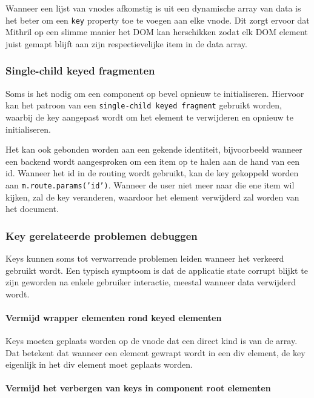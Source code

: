 Wanneer een lijst van vnodes afkomstig is uit een dynamische array van data is het beter om een \texttt{key} property toe te voegen aan elke vnode. Dit zorgt ervoor dat Mithril op een slimme manier het DOM kan herschikken zodat elk DOM element juist gemapt blijft aan zijn respectievelijke item in de data array. \autocite{Mithril2019d}

\subsubsection{Single-child keyed fragmenten}

Soms is het nodig om een component op bevel opnieuw te initialiseren. Hiervoor kan het patroon van een \texttt{single-child keyed fragment} gebruikt worden, waarbij de key aangepast wordt om het element te verwijderen en opnieuw te initialiseren. \autocite{Mithril2019d}

Het kan ook gebonden worden aan een gekende identiteit, bijvoorbeeld wanneer een backend wordt aangesproken om een item op te halen aan de hand van een id. Wanneer het id in de routing wordt gebruikt, kan de key gekoppeld worden aan \texttt{m.route.params('id')}. Wanneer de user niet meer naar die ene item wil kijken, zal de key veranderen, waardoor het element verwijderd zal worden van het document. \autocite{Mithril2019d}

\subsubsection{Key gerelateerde problemen debuggen}

Keys kunnen soms tot verwarrende problemen leiden wanneer het verkeerd gebruikt wordt. Een typisch symptoom is dat de applicatie state corrupt blijkt te zijn geworden na enkele gebruiker interactie, meestal wanneer data verwijderd wordt.  \autocite{Mithril2019d}

\paragraph{Vermijd wrapper elementen rond keyed elementen}

Keys moeten geplaats worden op de vnode dat een direct kind is van de array. Dat betekent dat wanneer een element gewrapt wordt in een div element, de key eigenlijk in het div element moet geplaats worden. \autocite{Mithril2019d}

\paragraph{Vermijd het verbergen van keys in component root elementen}

